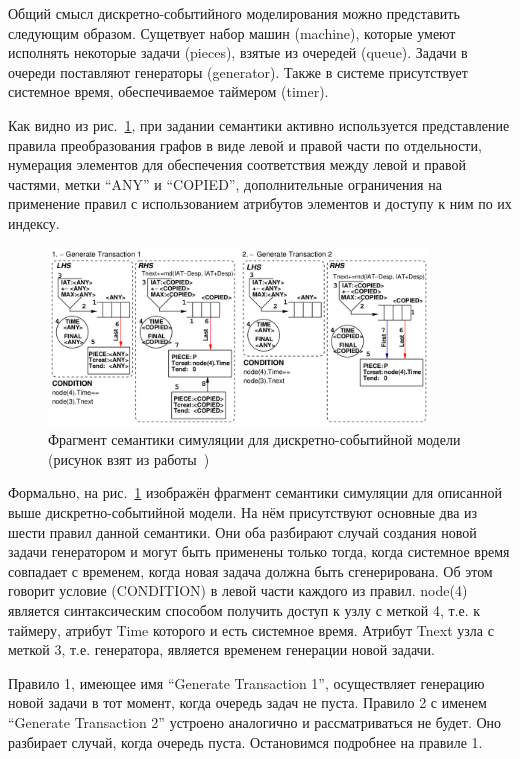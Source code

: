 \documentclass[a5paper]{article}
\begin{document}
Общий смысл дискретно-событийного моделирования можно представить следующим образом. Сущетвует набор машин (machine), которые умеют исполнять некоторые задачи (pieces), взятые из очередей (queue). Задачи в очереди поставляют генераторы (generator). Также в системе присутствует системное время, обеспечиваемое таймером (timer).

Как видно из рис.~\ref{fig1}, при задании семантики активно используется представление правила преобразования графов в виде левой и правой части по отдельности, нумерация элементов для обеспечения соответствия между левой и правой частями, метки “ANY” и “COPIED”, дополнительные ограничения на применение правил с использованием атрибутов элементов и доступу к ним по их индексу.

\begin{figure} [ht]
  \begin{center}
    \includegraphics[width=0.9\textwidth]{1.png}
    \caption{Фрагмент семантики симуляции для дискретно-событийной модели (рисунок взят из работы~\cite{atom3})}
    \label{fig1}
  \end{center}
\end{figure}

Формально, на рис.~\ref{fig1} изображён фрагмент семантики симуляции для описанной выше дискретно-событийной модели. На нём присутствуют основные два из шести правил данной семантики. Они оба разбирают случай создания новой задачи генератором и могут быть применены только тогда, когда системное время совпадает с временем, когда новая задача должна быть сгенерирована. Об этом говорит условие (CONDITION) в левой части каждого из правил. node(4) является синтаксическим способом получить доступ к узлу с меткой 4, т.е. к таймеру, атрибут Time которого и есть системное время. Атрибут Tnext узла с меткой 3, т.е. генератора, является временем генерации новой задачи.

Правило 1, имеющее имя “Generate Transaction 1”, осуществляет генерацию новой задачи в тот момент, когда очередь задач не пуста. Правило 2 с именем “Generate Transaction 2” устроено аналогично и рассматриваться не будет. Оно разбирает случай, когда очередь пуста. Остановимся подробнее на правиле 1.
\end{document}
